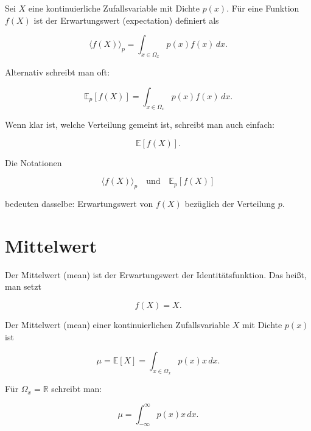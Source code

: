 \begin{definitionbox}
Sei \(X\) eine kontinuierliche Zufallsvariable mit Dichte \(p(x)\).
Für eine Funktion \(f(X)\) ist der Erwartungswert (expectation) definiert als

\[
    \langle f(X) \rangle_p
    =
    \int_{x \in \Omega_x}
    p(x) f(x)\,dx.
\]

Alternativ schreibt man oft:

\[
    \mathbb{E}_p[f(X)]
    =
    \int_{x \in \Omega_x}
    p(x) f(x)\,dx.
\]
\end{definitionbox}

Wenn klar ist, welche Verteilung gemeint ist, schreibt man auch einfach:

\[
    \mathbb{E}[f(X)].
\]

\begin{notebox}
Die Notationen

\[
    \langle f(X) \rangle_p
    \quad
    \text{und}
    \quad
    \mathbb{E}_p[f(X)]
\]

bedeuten dasselbe:
Erwartungswert von \(f(X)\) bezüglich der Verteilung \(p\).
\end{notebox}

\section{Mittelwert}

Der Mittelwert (mean) ist der Erwartungswert der Identitätsfunktion.
Das heißt, man setzt

\[
    f(X) = X.
\]

\begin{definitionbox}
Der Mittelwert (mean) einer kontinuierlichen Zufallsvariable \(X\) mit Dichte \(p(x)\) ist

\[
    \mu
    =
    \mathbb{E}[X]
    =
    \int_{x \in \Omega_x} p(x)x\,dx.
\]
\end{definitionbox}

Für \(\Omega_x = \mathbb{R}\) schreibt man:

\[
    \mu
    =
    \int_{-\infty}^{\infty} p(x)x\,dx.
\]

